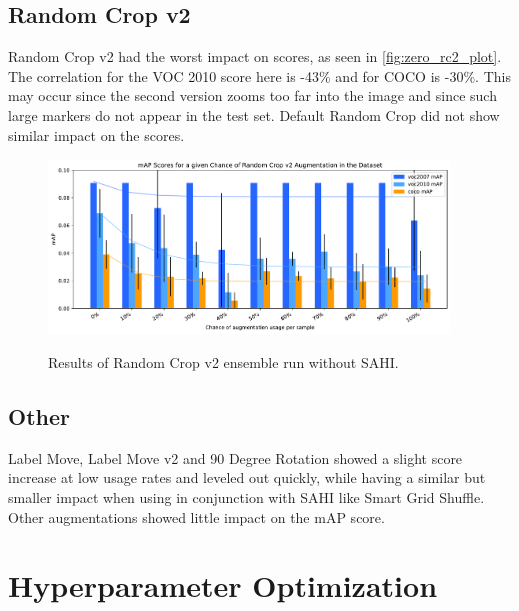 \documentclass[10pt]{book}
\newcommand{\figureref}[1]{\autoref{#1}}
\begin{document}

\subsection{Random Crop v2}

Random Crop v2 had the worst impact on scores, as seen in \figureref{fig:zero_rc2_plot}. The correlation for the VOC 2010 score here is -43\% and for \ac{COCO} is -30\%. This may occur since the second version zooms too far into the image and since such large markers do not appear in the test set. Default Random Crop did not show similar impact on the scores.

\begin{figure}
  \caption{Results of Random Crop v2 ensemble run without \ac{SAHI}.}
  \includegraphics[width=0.95\textwidth]{image/zero-based-rc2-ensemble-2-thesis}
  \label{fig:zero_rc2_plot}
\end{figure}

\subsection{Other} %

Label Move, Label Move v2 and 90 Degree Rotation showed a slight score increase at low usage rates and leveled out quickly, while having a similar but smaller impact when using in conjunction with \ac{SAHI} like Smart Grid Shuffle. Other augmentations showed little impact on the \ac{mAP} score.

\section{Hyperparameter Optimization}
\end{document}
